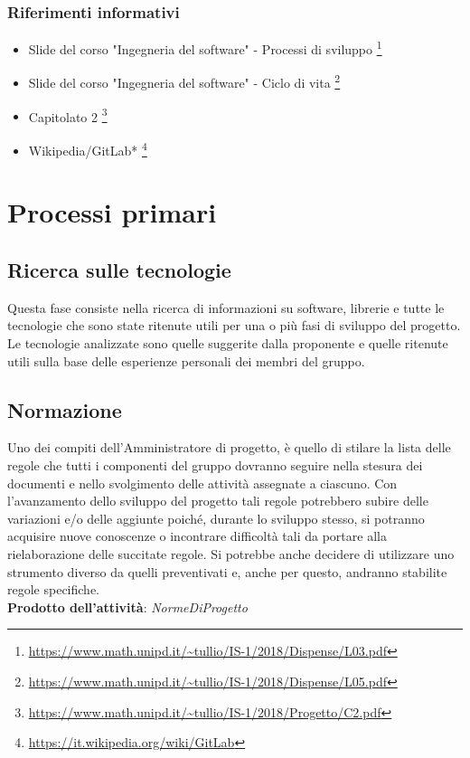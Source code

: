 \documentclass[11pt,a4paper]{article}
\begin{document}
	\subsubsection{Riferimenti informativi}
	\begin{itemize}
		\item Slide del corso "Ingegneria del software" - Processi di sviluppo 
		\footnote{\url{https://www.math.unipd.it/~tullio/IS-1/2018/Dispense/L03.pdf}}
		\item Slide del corso "Ingegneria del software" - Ciclo di vita 
		\footnote{\url{https://www.math.unipd.it/~tullio/IS-1/2018/Dispense/L05.pdf}}
		\item Capitolato 2
		\footnote{\url{https://www.math.unipd.it/~tullio/IS-1/2018/Progetto/C2.pdf}}
		\item Wikipedia/GitLab* 
		\footnote{\url {https://it.wikipedia.org/wiki/GitLab}}
	\end{itemize}					
	\newpage
	
	\section{Processi primari}
	\subsection{Ricerca sulle tecnologie} 
	Questa fase consiste nella ricerca di informazioni su software, librerie e tutte le tecnologie che sono state ritenute utili per una o più fasi di sviluppo del progetto. Le tecnologie analizzate  sono quelle suggerite dalla proponente e quelle ritenute utili sulla base delle esperienze personali dei membri del gruppo. 
	
	
	\subsection{Normazione}
	Uno dei compiti dell'Amministratore di progetto, è quello di stilare la lista delle regole che tutti i componenti del gruppo dovranno seguire nella stesura dei documenti e nello svolgimento delle attività assegnate a ciascuno. Con l'avanzamento dello sviluppo del progetto tali regole potrebbero subire delle variazioni e/o delle aggiunte poiché, durante lo sviluppo stesso, si potranno acquisire nuove conoscenze o incontrare difficoltà tali da portare alla rielaborazione delle succitate regole. Si potrebbe anche decidere di utilizzare uno strumento diverso da quelli preventivati e, anche per questo, andranno stabilite regole specifiche.\\
	\textbf{Prodotto dell'attività}: \textit{NormeDiProgetto}
	
\end{document}
